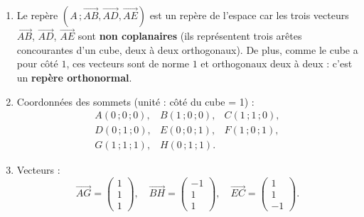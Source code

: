 \documentclass[11pt]{article}
\begin{document}
\begin{corrige}
\begin{enumerate}
\item Le repère $(A\,;\overrightarrow{AB},\overrightarrow{AD},\overrightarrow{AE})$ est un repère de l'espace car les trois vecteurs $\overrightarrow{AB}$, $\overrightarrow{AD}$, $\overrightarrow{AE}$ sont \textbf{non coplanaires} (ils représentent trois arêtes concourantes d'un cube, deux à deux orthogonaux). De plus, comme le cube a pour côté $1$, ces vecteurs sont de norme $1$ et orthogonaux deux à deux : c'est un \textbf{repère orthonormal}.

\item Coordonnées des sommets (unité : côté du cube = 1) :
\[
\begin{array}{lll}
A(0\,;0\,;0), & B(1\,;0\,;0), & C(1\,;1\,;0), \\
D(0\,;1\,;0), & E(0\,;0\,;1), & F(1\,;0\,;1), \\
G(1\,;1\,;1), & H(0\,;1\,;1).
\end{array}
\]

\item Vecteurs :
\[
\overrightarrow{AG} = \begin{pmatrix}1 \\ 1 \\ 1\end{pmatrix},\quad
\overrightarrow{BH} = \begin{pmatrix}-1 \\ 1 \\ 1\end{pmatrix},\quad
\overrightarrow{EC} = \begin{pmatrix}1 \\ 1 \\ -1\end{pmatrix}.
\]
\end{enumerate}
\end{corrige}
\end{document}
